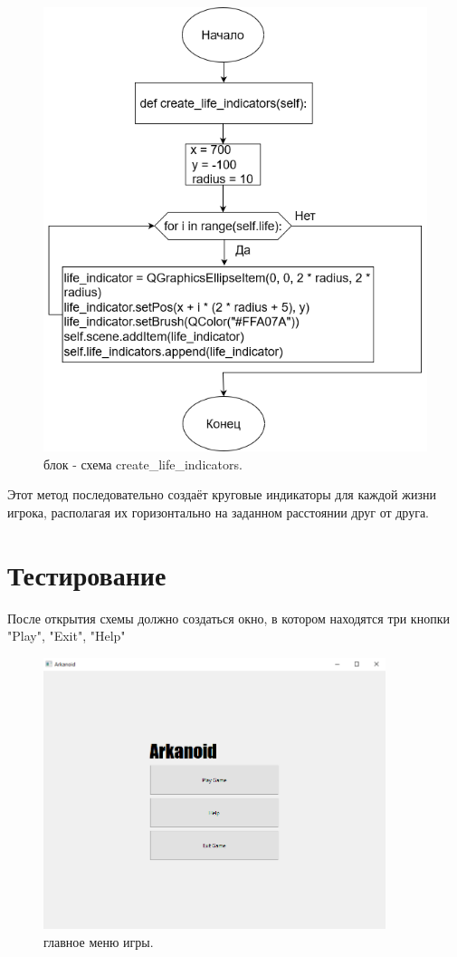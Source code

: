 \begin{figure} [!h]
  \centering
  \graphicspath{ {img/} }
  \includegraphics[width = 15cm]{image/22.png}
  \caption{блок - схема create\_life\_indicators. }
  \label{fig:image}
\end{figure}

Этот метод последовательно создаёт круговые индикаторы для каждой жизни игрока, располагая их горизонтально на заданном расстоянии друг от друга.

\section{\label{sec:ch02/sec03}Тестирование}

После открытия схемы должно создаться окно, в котором находятся три кнопки "Play", "Exit", "Help"

\begin{figure}[h!]
    \centering
    \graphicspath{ {img/} }
    \includegraphics[width = 10cm]{image/1.png}
    \caption{главное меню игры. }
    \label{fig:image}
\end{figure}


